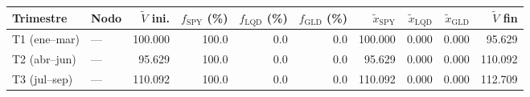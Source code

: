 {\footnotesize
\begin{tabular}{llrrrrrrrr}
\toprule
Trimestre & Nodo & $\tilde V$ ini. & $f_{\mathrm{SPY}}$ (\%) & $f_{\mathrm{LQD}}$ (\%) & $f_{\mathrm{GLD}}$ (\%) & $\tilde x_{\mathrm{SPY}}$ & $\tilde x_{\mathrm{LQD}}$ & $\tilde x_{\mathrm{GLD}}$ & $\tilde V$ fin \\
\midrule
T1 (ene–mar) & — & 100.000 & 100.0 & 0.0 & 0.0 & 100.000 & 0.000 & 0.000 & 95.629 \\
T2 (abr–jun) & — & 95.629 & 100.0 & 0.0 & 0.0 & 95.629 & 0.000 & 0.000 & 110.092 \\
T3 (jul–sep) & — & 110.092 & 100.0 & 0.0 & 0.0 & 110.092 & 0.000 & 0.000 & 112.709 \\
\bottomrule
\end{tabular}
}
